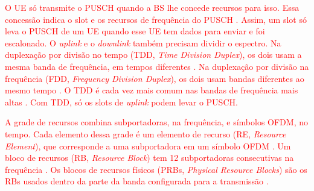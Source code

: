 \textcolor{red}{O UE só transmite o PUSCH quando a BS lhe concede recursos para isso. Essa concessão indica o slot e os recursos de frequência do PUSCH \cite[p.~293]{lin-lee-5g}. Assim, um slot só leva o PUSCH de um UE quando esse UE tem dados para enviar e foi escalonado. O \textit{uplink} e o \textit{downlink} também precisam dividir o espectro. Na duplexação por divisão no tempo (TDD, \textit{Time Division Duplex}), os dois usam a mesma banda de frequência, em tempos diferentes \cite[p.~104]{lin-lee-5g}. Na duplexação por divisão na frequência (FDD, \textit{Frequency Division Duplex}), os dois usam bandas diferentes ao mesmo tempo \cite[p.~104]{lin-lee-5g}. O TDD é cada vez mais comum nas bandas de frequência mais altas \cite[p.~10]{lin-lee-5g}. Com TDD, só os slots de \textit{uplink} podem levar o PUSCH.}

\textcolor{red}{A grade de recursos combina subportadoras, na frequência, e símbolos OFDM, no tempo. Cada elemento dessa grade é um elemento de recurso (RE, \textit{Resource Element}), que corresponde a uma subportadora em um símbolo OFDM \cite[Sec.~4.4.3]{3gpp-ts38211}. Um bloco de recursos (RB, \textit{Resource Block}) tem 12 subportadoras consecutivas na frequência \cite[Sec.~4.4.4.1]{3gpp-ts38211}. Os blocos de recursos físicos (PRBs, \textit{Physical Resource Blocks}) são os RBs usados dentro da parte da banda configurada para a transmissão \cite[Sec.~4.4.4.4]{3gpp-ts38211}.}

